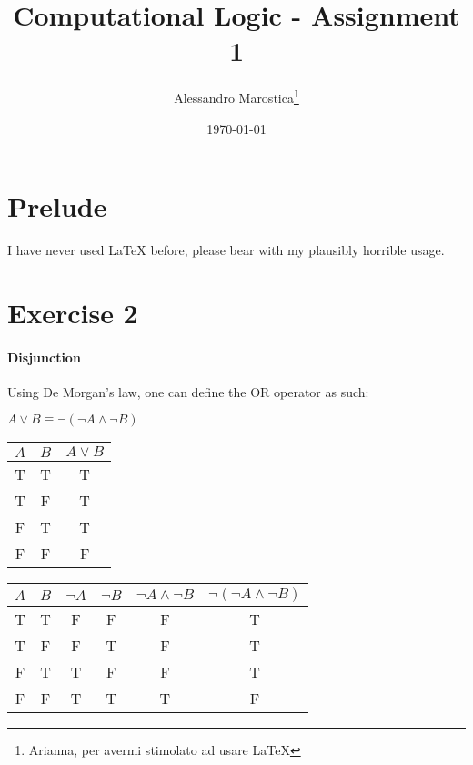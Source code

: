 \documentclass[11pt]{verifica}
\title{Computational Logic - Assignment 1}
\author{Alessandro Marostica\thanks{Arianna, per avermi stimolato ad usare LaTeX}}
\date{\today}
\begin{document}
\maketitle
\section*{Prelude}
I have never used LaTeX before, please bear with my plausibly horrible usage.
\section*{Exercise 2}
\paragraph*{Disjunction}
Using De Morgan's law, one can define the OR operator as such:
\begin{center}
    \(A \vee B \equiv \neg(\neg A \wedge \neg B)\)
\end{center}
\begin{center}
    \begin{tabular}{|c|c|c|}
        \hline
        \(A\) & \(B\) & \(A \vee B\) \\
        \hline
        T & T & T \\
        T & F & T \\
        F & T & T \\
        F & F & F \\
        \hline
    \end{tabular}
    \begin{tabular}{|c|c|c|c|c|c|}
        \hline
        \(A\) & \(B\) & \(\neg A\) & \(\neg B\) & \(\neg A \wedge \neg B\) & \(\neg(\neg A \wedge \neg B)\) \\
        \hline
        T & T & F & F & F & T \\
        T & F & F & T & F & T \\
        F & T & T & F & F & T \\
        F & F & T & T & T & F \\
        \hline       
    \end{tabular}
\end{center}
\end{document}
